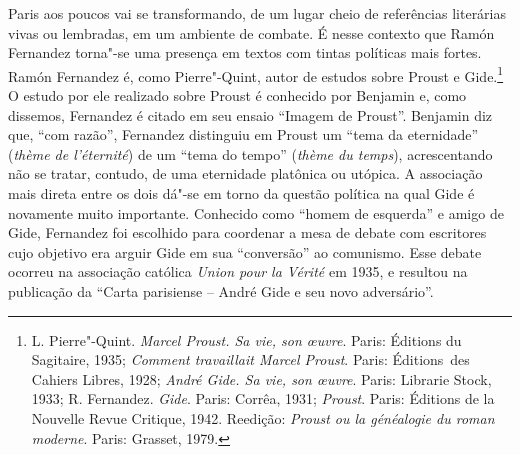 Paris aos poucos vai se transformando, de um lugar cheio de referências
literárias vivas ou lembradas, em um ambiente de combate. É nesse
contexto que Ramón Fernandez torna"-se uma presença em textos com tintas
políticas mais fortes. Ramón Fernandez é, como Pierre"-Quint, autor de
estudos sobre Proust e Gide.\footnote{L. Pierre"-Quint. \emph{Marcel
  Proust. Sa vie, son \oe uvre}. Paris: Éditions du Sagitaire, 1935;
  \emph{Comment travaillait Marcel Proust}. Paris: Éditions~des Cahiers Libres,
1928; \emph{André Gide. Sa vie, son \oe uvre}. Paris: Librarie
  Stock, 1933; R. Fernandez. \emph{Gide}. Paris: Corrêa, 1931;
  \emph{Proust}. Paris: Éditions de la Nouvelle Revue Critique, 1942.
  Reedição: \emph{Proust ou la généalogie du roman moderne}. Paris: Grasset,
  1979.} O estudo por ele realizado sobre Proust é conhecido por
Benjamin e, como dissemos, Fernandez é citado em seu ensaio ``Imagem de
Proust''. Benjamin diz que, ``com razão'', Fernandez distinguiu em
Proust um ``tema da eternidade'' (\emph{thème de l'éternité}) de um
``tema do tempo'' (\emph{thème du temps}), acrescentando não se tratar,
contudo, de uma eternidade platônica ou utópica. A associação mais
direta entre os dois dá"-se em torno da questão política na qual Gide é
novamente muito importante. Conhecido como ``homem de esquerda'' e amigo
de Gide, Fernandez foi escolhido para coordenar a mesa de debate com
escritores cujo objetivo era arguir Gide em sua ``conversão'' ao
comunismo. Esse debate ocorreu na associação católica \emph{Union pour la
Vérité} em 1935, e resultou na publicação da ``Carta parisiense  --
André Gide e seu novo adversário''.

